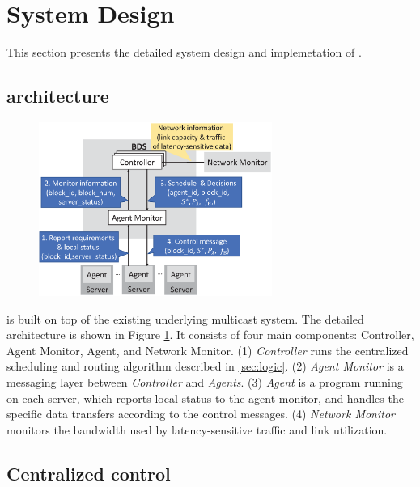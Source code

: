 \section{System Design}
\label{sec:system}

This section presents the detailed system design and implemetation of \name.%

\subsection{\name architecture}
\label{subsec:system:architecture}

\begin{figure}[t]
  \centering
  \includegraphics[width=3in]{images/implementation_v2.eps}
  \label{fig:implementation}
\vspace{-0.4cm}
\end{figure}

\name is built on top of the existing underlying multicast system. The detailed architecture is shown in Figure \ref{fig:implementation}. It consists of four main components: Controller, Agent Monitor, Agent, and Network Monitor.
(1) \emph{Controller} runs the centralized scheduling and routing algorithm described in \Section\ref{sec:logic}.
(2) \emph{Agent Monitor} is a messaging layer between \emph{Controller} and \emph{Agents}.
(3) \emph{Agent} is a program running on each server, which reports local status to the agent monitor, and handles the specific data transfers according to the control messages.
(4) \emph{Network Monitor} monitors the bandwidth used by latency-sensitive traffic and link utilization.

\subsection{Centralized control}
\label{subsec:system:centralized}

